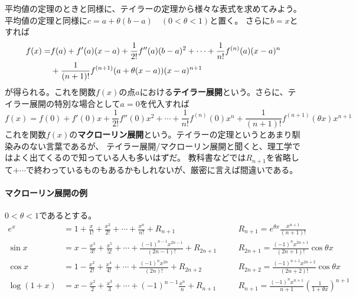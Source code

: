\documentclass[a4j,dvipdfmx]{jsarticle}
\begin{document}
                    平均値の定理のときと同様に、テイラーの定理から様々な表式を求めてみよう。平均値の定理と同様に$c=a+\theta(b-a)\quad(0<\theta<1)$と置く。
                    さらに$b=x$とすれば
                    \begin{alignat}{1}        
                        f(x)=&{}f(a)+f'(a)(x-a)+\frac{1}{2!}f''(a)(b-a)^2+\cdots+\frac{1}{n!}f^{(n)}(a)(x-a)^{n}\notag\\
                        &{}+\frac{1}{(n+1)!}f^{(n+1)}(a+\theta(x-a))(x-a)^{n+1}\label{eq:テイラー展開}
                    \end{alignat}
                    が得られる。これを関数$f(x)$の点$a$における\textbf{テイラー展開}という。さらに、テイラー展開の特別な場合として$a=0$を代入すれば
                    \begin{equation}
                        f(x)=f(0)+f'(0)x+\frac{1}{2!}f''(0)x^2+\cdots+\frac{1}{n!}f^{(n)}(0)x^n+\frac{1}{(n+1)!}f^{(n+1)}(\theta x)x^{n+1}\label{eq:マクローリン展開}
                    \end{equation}
                    これを関数$f(x)$の\textbf{マクローリン展開}という。テイラーの定理というとあまり馴染みのない言葉であるが、
                    テイラー展開/マクローリン展開と聞くと、理工学ではよく出てくるので知っている人も多いはずだ。
                    教科書などでは$R_{n+1}$を省略して$+\cdots$で終わっているものもあるかもしれないが、厳密に言えば間違いである。

                    \paragraph{マクローリン展開の例}$0<\theta<1$であるとする。
                        \begin{align}
                            e^x&=1+\frac{x}{1!}+\frac{x^2}{2!}+\cdots+\frac{x^n}{n!}+R_{n+1}\quad &&R_{n+1}=e^{\theta x}\frac{x^{n+1}}{(n+1)!}\label{eq:e^xのマクローリン展開}\\
                            \sin x &=x-\frac{x^3}{3!}+\frac{x^5}{5!}+\cdots+\frac{(-1)^{n-1}x^{2n-1}}{(2n-1)!}+R_{2n+1}\quad &&R_{2n+1}=\frac{(-1)^nx^{2n+1}}{(2n+1)!}\cos\theta x \label{eq:sin xのマクローリン展開}\\
                            \cos x &=1-\frac{x^2}{2!}+\frac{x^4}{4!}+\cdots+\frac{(-1)^{n}x^{2n}}{(2n)!}+R_{2n+2}\quad &&R_{2n+2}=\frac{(-1)^{n+1}x^{2n+2}}{(2n+2)!}\cos\theta x\label{eq:cos xのマクローリン展開}\\
                            \log(1+x) &= x-\frac{x^2}{2}+\frac{x^3}{3}+\cdots+(-1)^{n-1}\frac{x^n}{n}+R_{n+1}\quad &&R_{n+1}=\frac{(-1)^nx^{n+1}}{n+1}\left(\frac{1}{1+\theta x}\right)^{n+1}\label{eq:log(x+1)のマクローリン展開}
                        \end{align}
                    
\end{document}
